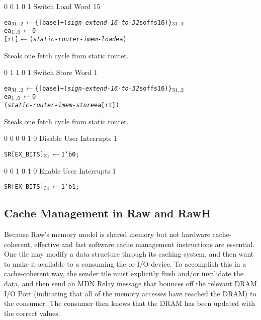      {0 0 1 0 1}    {Switch Load Word}               {1}{5} {\RawTag}
\begin{alltt}
        ea\(\sb{31..2}\) \hspace{.25mm} \(\leftarrow\) \{ [base] + ({\em{sign-extend-16-to-32}} soffs16) \}\(\sb{31..2}\)
        ea\(\sb{1..0}\)   \(\leftarrow\) 0
        [rt]  \hspace{1mm} \(\leftarrow\) ({\em{static-router-imem-load}} ea)
\end{alltt}
Steals one fetch cycle from static router.
\rawInstrEnd

     {0 1 1 0 1}    {Switch Store Word}               {1} {\RawTag}
\begin{alltt}
        ea\(\sb{31..2}\) \hspace{.25mm} \(\leftarrow\) \{ [base] + ({\em{sign-extend-16-to-32}} soffs16) \}\(\sb{31..2}\)
        ea\(\sb{1..0}\)   \(\leftarrow\) 0
        ({\em{static-router-imem-store}} ea [rt])
\end{alltt}
Steals one fetch cycle from static router.
\rawInstrEnd

      {0 0 0 0 1 0} {Disable User Interrupts}   {1}   {\RawTag}
\begin{alltt}
        SR[EX_BITS]\({\sb{31}}\) \(\leftarrow\) 1'b0;
\end{alltt}\rawInstrEnd

      {0 0 1 0 1 0} {Enable User Interrupts}   {1}   {\RawTag}
\begin{alltt}
        SR[EX_BITS]\({\sb{31}}\) \(\leftarrow\) 1'b1;
\end{alltt}\rawInstrEnd

\newpage
\standardstretch
\subsection{Cache Management in Raw and RawH}
\label{subsec:cache-management}

Because Raw's memory model is shared memory but not hardware cache-coherent, effective
and fast software cache management instructions are essential. One tile may modify a 
data structure through its caching system, and then want to make it available to a consuming tile or I/O device. 
To accomplish this in a cache-coherent way, the sender tile must explicitly flush and/or invalidate the
data, and then send an MDN Relay message that bounces off the relevant DRAM I/O Port
(indicating that all of the memory accesses have reached the DRAM) to the consumer. The
consumer then knows that the DRAM has been updated with the correct values.

